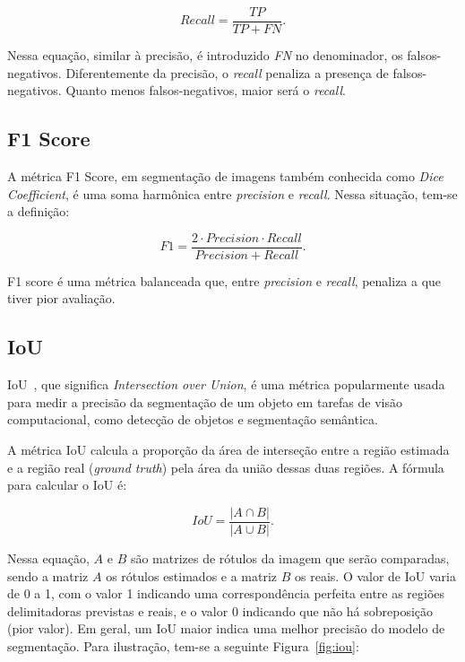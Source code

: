 \begin{equation}\label{eq:recall}
  Recall = \dfrac{TP}{TP + FN}.
\end{equation}

Nessa equação, similar à precisão, é introduzido \textit{FN} no denominador,
os falsos-negativos. Diferentemente da precisão, o \textit{recall} penaliza
a presença de falsos-negativos. Quanto menos falsos-negativos, maior
será o \textit{recall}.

\subsection{F1 Score}\label{sec:f1}

A métrica F1 Score, em segmentação de imagens também conhecida como
\textit{Dice Coefficient}, é uma soma harmônica entre \textit{precision} e
\textit{recall}. Nessa situação, tem-se a definição:


\begin{equation}\label{eq:recall}
  F1 = \dfrac{2 \cdot Precision \cdot Recall}{Precision + Recall}.
\end{equation}

F1 score é uma métrica balanceada que, entre \textit{precision} e \textit{recall},
penaliza a que tiver pior avaliação.

\subsection{IoU}\label{sec:iou}

IoU~\cite{rezatofighi2019generalized}, que significa
\textit{Intersection over Union}, é uma métrica popularmente usada
para medir a precisão da segmentação de um objeto em tarefas de visão
computacional, como detecção de objetos e segmentação semântica.

A métrica IoU calcula a proporção da área de interseção entre a região
estimada e a região real (\textit{ground truth}) pela área da união dessas duas
regiões. A fórmula para calcular o IoU é:

\begin{equation}\label{eq:iou}
  IoU = \dfrac{\left| A \cap B \right|}{\left| A \cup B \right|}.
\end{equation}


Nessa equação, $A$ e $B$ são matrizes de rótulos da imagem que serão
comparadas, sendo a matriz $A$ os rótulos estimados e a matriz $B$ os
reais. O valor de IoU varia de 0 a 1, com o valor 1 indicando uma
correspondência perfeita entre as regiões delimitadoras previstas e
reais, e o valor 0 indicando que não há sobreposição (pior valor). Em
geral, um IoU maior indica uma melhor precisão do modelo de
segmentação. Para ilustração, tem-se a seguinte Figura~\ref{fig:iou}:

